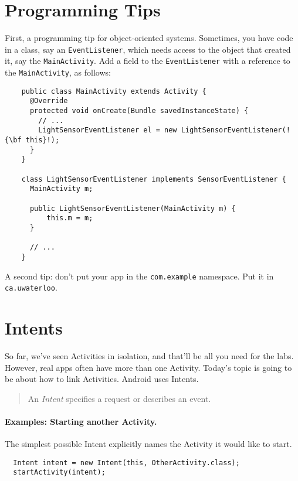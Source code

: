 




\section*{Programming Tips}

First, a programming tip for object-oriented systems. Sometimes, you have code
in a class, say an {\tt EventListener}, which needs access to the object
that created it, say the {\tt MainActivity}. Add a field to the {\tt EventListener}
with a reference to the {\tt MainActivity}, as follows:

{ \begin{verbatim}
    public class MainActivity extends Activity {
      @Override
      protected void onCreate(Bundle savedInstanceState) {
        // ...
        LightSensorEventListener el = new LightSensorEventListener(!{\bf this}!);
      }
    }

    class LightSensorEventListener implements SensorEventListener {
      MainActivity m;

      public LightSensorEventListener(MainActivity m) {
          this.m = m;
      }

      // ...
    }
\end{verbatim}
}

A second tip: don't put your app in the {\tt com.example} namespace. Put it
in {\tt ca.uwaterloo}.

\section*{Intents}
So far, we've seen Activities in isolation, and that'll be all you need
for the labs. However, real apps often have more than one Activity. Today's topic
is going to be about how to link Activities. Android uses Intents.

\begin{quote}
An \emph{Intent} specifies a request or describes an event.
\end{quote}

\paragraph{Examples: Starting another Activity.} The simplest possible Intent
explicitly names the Activity it would like to start.

{ 
\begin{verbatim}
  Intent intent = new Intent(this, OtherActivity.class);
  startActivity(intent);
\end{verbatim}
}

